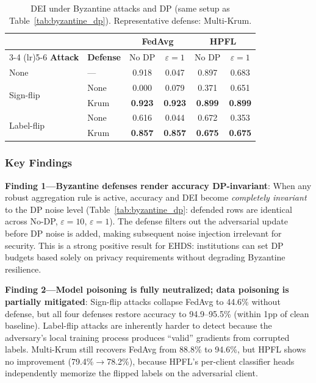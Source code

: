 \documentclass[conference]{IEEEtran}
\begin{document}
\begin{table}[htbp]
\centering
\caption{DEI under Byzantine attacks and DP (same setup as Table~\ref{tab:byzantine_dp}). Representative defense: Multi-Krum.}
\label{tab:byzantine_dp_dei}
\small
\begin{tabular}{ll cc cc}
\toprule
& & \multicolumn{2}{c}{\textbf{FedAvg}} & \multicolumn{2}{c}{\textbf{HPFL}} \\
\cmidrule(lr){3-4} \cmidrule(lr){5-6}
\textbf{Attack} & \textbf{Defense} & No DP & $\varepsilon{=}1$ & No DP & $\varepsilon{=}1$ \\
\midrule
None & --- & 0.918 & 0.047 & 0.897 & 0.683 \\
\midrule
\multirow{2}{*}{Sign-flip}
 & None & 0.000 & 0.079 & 0.371 & 0.651 \\
 & Krum & \textbf{0.923} & \textbf{0.923} & \textbf{0.899} & \textbf{0.899} \\
\midrule
\multirow{2}{*}{Label-flip}
 & None & 0.616 & 0.044 & 0.672 & 0.353 \\
 & Krum & \textbf{0.857} & \textbf{0.857} & \textbf{0.675} & \textbf{0.675} \\
\bottomrule
\end{tabular}
\end{table}

\subsubsection{Key Findings}

\textbf{Finding 1---Byzantine defenses render accuracy DP-invariant}: When any robust aggregation rule is active, accuracy and DEI become \textit{completely invariant} to the DP noise level (Table~\ref{tab:byzantine_dp}: defended rows are identical across No-DP, $\varepsilon{=}10$, $\varepsilon{=}1$). The defense filters out the adversarial update before DP noise is added, making subsequent noise injection irrelevant for security. This is a strong positive result for EHDS: institutions can set DP budgets based solely on privacy requirements without degrading Byzantine resilience.

\textbf{Finding 2---Model poisoning is fully neutralized; data poisoning is partially mitigated}: Sign-flip attacks collapse FedAvg to 44.6\% without defense, but all four defenses restore accuracy to 94.9--95.5\% (within 1pp of clean baseline). Label-flip attacks are inherently harder to detect because the adversary's local training process produces ``valid'' gradients from corrupted labels. Multi-Krum still recovers FedAvg from 88.8\% to 94.6\%, but HPFL shows no improvement (79.4\%$\to$78.2\%), because HPFL's per-client classifier heads independently memorize the flipped labels on the adversarial client.
\end{document}
